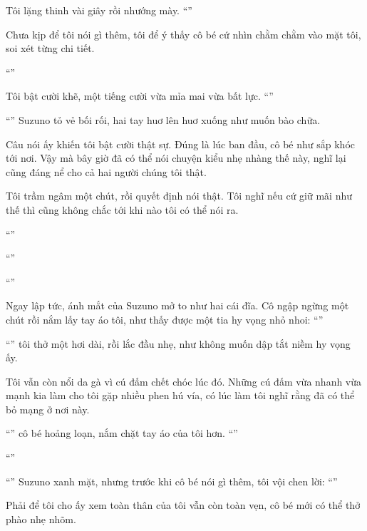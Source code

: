 \documentclass[../main.tex]{subfiles}
\begin{document}
Tôi lặng thinh vài giây rồi nhướng mày. ``''

Chưa kịp để tôi nói gì thêm, tôi để ý thấy cô bé cứ nhìn chằm chằm vào mặt tôi, soi xét từng chi tiết.

``''

Tôi bật cười khẽ, một tiếng cười vừa mỉa mai vừa bất lực. ``''

``'' Suzuno tỏ vẻ bối rối, hai tay huơ lên huơ xuống như muốn bào chữa.

Câu nói ấy khiến tôi bật cười thật sự. Đúng là lúc ban đầu, cô bé như sắp khóc tới nơi. Vậy mà bây giờ đã có thể nói chuyện kiểu nhẹ nhàng thế này, nghĩ lại cũng đáng nể cho cả hai người chúng tôi thật.

Tôi trầm ngâm một chút, rồi quyết định nói thật. Tôi nghĩ nếu cứ giữ mãi như thế thì cũng không chắc tới khi nào tôi có thể nói ra.

``''

``''

``''

Ngay lập tức, ánh mắt của Suzuno mở to như hai cái đĩa. Cô ngập ngừng một chút rồi nắm lấy tay áo tôi, như thấy được một tia hy vọng nhỏ nhoi: ``''

``'' tôi thở một hơi dài, rồi lắc đầu nhẹ, như không muốn dập tắt niềm hy vọng ấy. 

Tôi vẫn còn nổi da gà vì cú đấm chết chóc lúc đó. Những cú đấm vừa nhanh vừa mạnh kia làm cho tôi gặp nhiều phen hú vía, có lúc làm tôi nghĩ rằng đã có thể bỏ mạng ở nơi này.

``'' cô bé hoảng loạn, nắm chặt tay áo của tôi hơn. ``''

``''

``'' Suzuno xanh mặt, nhưng trước khi cô bé nói gì thêm, tôi vội chen lời: ``''

Phải để tôi cho ấy xem toàn thân của tôi vẫn còn toàn vẹn, cô bé mới có thể thở phào nhẹ nhõm.
\end{document}
